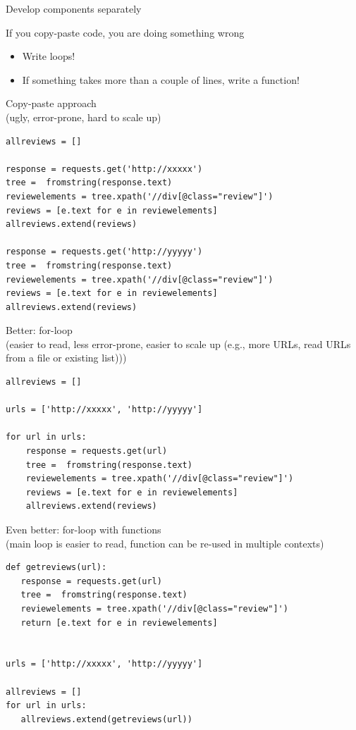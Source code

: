 \begin{frame}{Develop components separately}
	\begin{block}{If you copy-paste code, you are doing something wrong}
		\begin{itemize}[<+->]
			\item Write loops!
			\item If something takes more than a couple of lines, write a function!
		\end{itemize}
	\end{block}
\end{frame}

\begin{frame}
Copy-paste approach\\ (ugly, error-prone, hard to scale up)
\begin{verbatim}
allreviews = []

response = requests.get('http://xxxxx')
tree =  fromstring(response.text)
reviewelements = tree.xpath('//div[@class="review"]')
reviews = [e.text for e in reviewelements]
allreviews.extend(reviews)

response = requests.get('http://yyyyy')
tree =  fromstring(response.text)
reviewelements = tree.xpath('//div[@class="review"]')
reviews = [e.text for e in reviewelements]
allreviews.extend(reviews)
\end{verbatim}
\end{frame}


\begin{frame}
Better: for-loop\\ (easier to read, less error-prone, easier to scale up (e.g., more URLs, read URLs from a file or existing list)))
\begin{verbatim}
allreviews = []

urls = ['http://xxxxx', 'http://yyyyy']

for url in urls:
    response = requests.get(url)
    tree =  fromstring(response.text)
    reviewelements = tree.xpath('//div[@class="review"]')
    reviews = [e.text for e in reviewelements]
    allreviews.extend(reviews)
\end{verbatim}
\end{frame}




\begin{frame}
Even better: for-loop with functions\\ (main loop is easier to read, function can be re-used in multiple contexts)
\begin{verbatim}
def getreviews(url):
   response = requests.get(url)
   tree =  fromstring(response.text)
   reviewelements = tree.xpath('//div[@class="review"]')
   return [e.text for e in reviewelements]


urls = ['http://xxxxx', 'http://yyyyy']

allreviews = []
for url in urls:
   allreviews.extend(getreviews(url))
\end{verbatim}
\end{frame}





